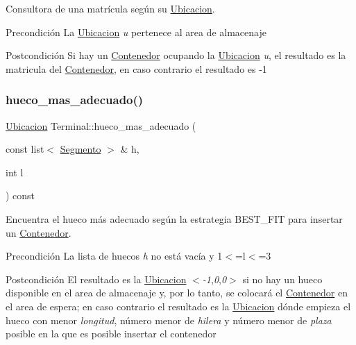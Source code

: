Consultora de una matrícula según su \hyperlink{class_ubicacion}{Ubicacion}. 

\begin{DoxyPrecond}{Precondición}
La \hyperlink{class_ubicacion}{Ubicacion} {\itshape u} pertenece al area de almacenaje 
\end{DoxyPrecond}
\begin{DoxyPostcond}{Postcondición}
Si hay un \hyperlink{class_contenedor}{Contenedor} ocupando la \hyperlink{class_ubicacion}{Ubicacion} {\itshape u}, el resultado es la matricula del \hyperlink{class_contenedor}{Contenedor}, en caso contrario el resultado es -\/1 
\end{DoxyPostcond}
\mbox{\label{class_terminal_ab14183e499defc434f593c5767605834}} 
\subsubsection{\texorpdfstring{hueco\+\_\+mas\+\_\+adecuado()}{hueco\_mas\_adecuado()}}
{\footnotesize\ttfamily \hyperlink{class_ubicacion}{Ubicacion} Terminal\+::hueco\+\_\+mas\+\_\+adecuado (\begin{DoxyParamCaption}\item[{const list$<$ \hyperlink{class_segmento}{Segmento} $>$ \&}]{h,  }\item[{int}]{l }\end{DoxyParamCaption}) const}



Encuentra el hueco más adecuado según la estrategia B\+E\+S\+T\+\_\+\+F\+IT para insertar un \hyperlink{class_contenedor}{Contenedor}. 

\begin{DoxyPrecond}{Precondición}
La lista de huecos {\itshape h} no está vacía y 1$<$=l$<$=3 
\end{DoxyPrecond}
\begin{DoxyPostcond}{Postcondición}
El resultado es la \hyperlink{class_ubicacion}{Ubicacion} $<${\itshape -\/1},{\itshape 0},{\itshape 0}$>$ si no hay un hueco disponible en el area de almacenaje y, por lo tanto, se colocará el \hyperlink{class_contenedor}{Contenedor} en el area de espera; en caso contrario el resultado es la \hyperlink{class_ubicacion}{Ubicacion} dónde empieza el hueco con menor {\itshape longitud}, número menor de {\itshape hilera} y número menor de {\itshape plaza} posible en la que es posible insertar el contenedor 
\end{DoxyPostcond}
\mbox{\label{class_terminal_a6b2cb1486f78ef82f759fb071bb1049d}} 
